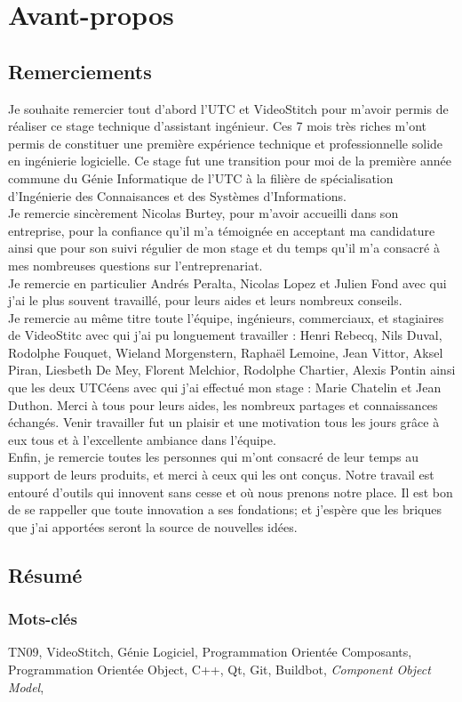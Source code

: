 \chapter*{Avant-propos}

\section*{Remerciements}
Je souhaite remercier tout d'abord l'UTC et VideoStitch pour m'avoir permis de 
réaliser ce stage technique d'assistant ingénieur. Ces 7 mois très riches m'ont 
permis de constituer une première expérience technique et professionnelle solide 
en ingénierie logicielle. Ce stage fut une transition pour moi de la première 
année commune du Génie Informatique de l'UTC à la filière de spécialisation 
d'Ingénierie des Connaisances et des Systèmes d'Informations.\\
\newline
Je remercie sincèrement Nicolas Burtey, pour m'avoir accueilli dans son entreprise,
pour la confiance qu'il m'a témoignée en acceptant ma candidature ainsi que pour
son suivi régulier de mon stage et du temps qu'il m'a consacré à mes nombreuses
questions sur l'entreprenariat.\\
Je remercie en particulier Andrés Peralta, Nicolas Lopez et Julien Fond avec qui 
j'ai le plus souvent travaillé, pour leurs aides et leurs nombreux conseils.\\
Je remercie au même titre toute l'équipe, ingénieurs, commerciaux, et stagiaires 
de VideoStitc avec qui j'ai pu longuement travailler :
Henri Rebecq, Nils Duval, Rodolphe Fouquet, Wieland Morgenstern, Raphaël 
Lemoine, Jean Vittor, Aksel Piran, Liesbeth De Mey, Florent Melchior, Rodolphe 
Chartier, Alexis Pontin ainsi que les deux UTCéens avec qui j'ai effectué mon 
stage : Marie Chatelin et Jean Duthon. Merci à tous pour leurs aides, 
les nombreux partages et connaissances échangés. Venir travailler fut un plaisir 
et une motivation tous les jours grâce à eux tous et à l'excellente ambiance dans l'équipe.\\
\newline
Enfin, je remercie toutes les personnes qui m'ont consacré de leur temps au support 
de leurs produits, et merci à ceux qui les ont conçus. Notre travail est entouré 
d'outils qui innovent sans cesse et où nous prenons notre place. Il est bon de 
se rappeller que toute innovation a ses fondations; et j'espère que les briques 
que j'ai apportées seront la source de nouvelles idées.


\section*{Résumé}

\subsection*{Mots-clés}
TN09, VideoStitch, Génie Logiciel, Programmation Orientée Composants, 
Programmation Orientée Object, C++, Qt, Git, Buildbot, \textit{Component Object Model},
